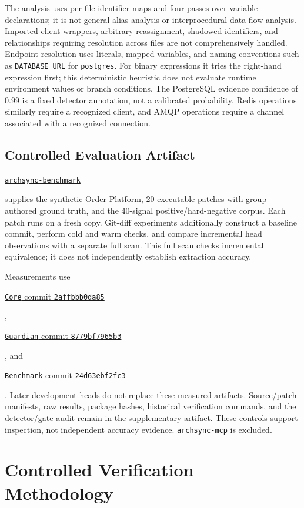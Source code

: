 \documentclass[conference]{IEEEtran}
\newif\ifarchsyncanonymous
\newcommand{\archsyncrepository}[2]{%
  \ifarchsyncanonymous
    \nolinkurl{#1} (blinded)%
  \else
    \href{#2}{\nolinkurl{#1}}%
  \fi
}
\newcommand{\archsynccommit}[4]{%
  \ifarchsyncanonymous
    \texttt{#1} commit \texttt{#4} (blinded artifact)%
  \else
    \href{#2/commit/#3}{\texttt{#1} commit \texttt{#4}}%
  \fi
}
\begin{document}
The analysis uses per-file identifier maps and four passes over variable declarations; it is not general alias analysis or interprocedural data-flow analysis. Imported client wrappers, arbitrary reassignment, shadowed identifiers, and relationships requiring resolution across files are not comprehensively handled. Endpoint resolution uses literals, mapped variables, and naming conventions such as \texttt{DATABASE\_URL} for \texttt{postgres}. For binary expressions it tries the right-hand expression first; this deterministic heuristic does not evaluate runtime environment values or branch conditions. The PostgreSQL evidence confidence of 0.99 is a fixed detector annotation, not a calibrated probability. Redis operations similarly require a recognized client, and AMQP operations require a channel associated with a recognized connection.

\subsection{Controlled Evaluation Artifact}

\archsyncrepository{archsync-benchmark}{https://github.com/Little-Boy-s-ArchSync/archsync-benchmark} supplies the synthetic Order Platform, 20 executable patches with group-authored ground truth, and the 40-signal positive/hard-negative corpus. Each patch runs on a fresh copy. Git-diff experiments additionally construct a baseline commit, perform cold and warm checks, and compare incremental head observations with a separate full scan. This full scan checks incremental equivalence; it does not independently establish extraction accuracy.

Measurements use \archsynccommit{Core}{https://github.com/Little-Boy-s-ArchSync/archsync-core}{2affbbb0da859a32b9b9079b4bf718fc7b14993b}{2affbbb0da85}, \archsynccommit{Guardian}{https://github.com/Little-Boy-s-ArchSync/archsync-guardian}{8779bf7965b3bd15f25834f17ca5321c85ae3f43}{8779bf7965b3}, and \archsynccommit{Benchmark}{https://github.com/Little-Boy-s-ArchSync/archsync-benchmark}{24d63ebf2fc3075a1d64f1eaff38cdc0b7f586fb}{24d63ebf2fc3}. Later development heads do not replace these measured artifacts. Source/patch manifests, raw results, package hashes, historical verification commands, and the detector/gate audit remain in the supplementary artifact. These controls support inspection, not independent accuracy evidence. \texttt{archsync-mcp} is excluded.

\section{Controlled Verification Methodology}
\end{document}
